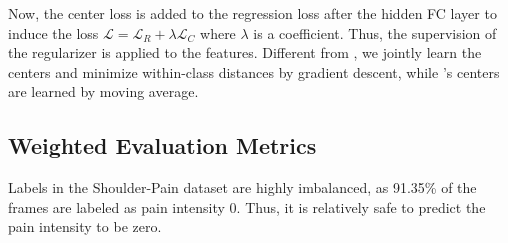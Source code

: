 \documentclass{article}
\begin{document}
Now, the center loss is added to the regression loss after the hidden FC layer to induce the loss $\mathcal{L} = \mathcal{L}_R + \lambda \mathcal{L}_C$ where $\lambda$ is a coefficient.
Thus, the supervision of the regularizer is applied to the features.
Different from \cite{wen2016discriminative}, we jointly learn the centers and minimize within-class distances by gradient descent, while \cite{wen2016discriminative}'s centers are learned by moving average.  

\subsection{Weighted Evaluation Metrics}\label{sec:wmet}
\vspace{-2mm}
\noindent Labels in the Shoulder-Pain dataset are highly imbalanced, as 91.35\% of the frames are labeled as pain intensity 0. 
Thus, it is relatively safe to predict the pain intensity to be zero. 
\end{document}
